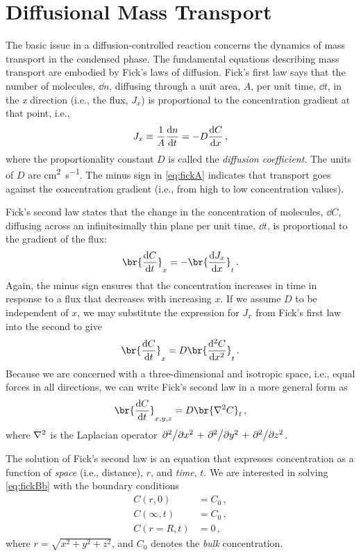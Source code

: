 \documentclass[nobib,nofonts,nols,nohyper]{tufte-handout}
\begin{document}
\section{Diffusional Mass Transport} %
\label{sec:mass_trans}
The basic issue in a diffusion-controlled reaction concerns the dynamics of mass transport in the condensed phase. 
The fundamental equations describing mass transport are embodied by Fick's laws of diffusion. 
Fick's first law says that the number of molecules, \( \dd{n} \), diffusing through a unit area, \( A \), per unit time, \( \dd{t} \), in the \emph{x} direction (i.e., the flux, \( J_x \)) is proportional to the concentration gradient at that point, i.e.,
\begin{equation}
	J_x \equiv \frac{1}{A}\dv{n}{t} = -D \dv{C}{x} \, ,
	\label{eq:fickA}
\end{equation}
where the proportionality constant \( D \) is called the \emph{diffusion coefficient}. 
The units of \( D \) are \unit{\cm\squared \per \s}. 
The minus sign in \cref{eq:fickA} indicates that transport goes against the concentration gradient
(i.e., from high to low concentration values).

Fick's second law states that the change in the concentration of molecules, \( \dd{C} \), diffusing
across an infinitesimally thin plane per unit time, \( \dd{t} \), is proportional to the gradient of the flux:
\begin{equation}
	\br{\dv{C}{t}}_x = - \br{\dv{J_x}{x}}_t \, .
\end{equation}
Again, the minus sign ensures that the concentration increases in time in response to a flux that decreases with increasing \( x \).
If we assume \( D \) to be independent of \( x \), we may substitute the expression for \( J_x \) from Fick's first law into the second to give
\begin{equation}
	\br{\dv{C}{t}}_x = D \br{\dv[2]{C}{x}}_t \, .
	\label{eq:fickBa}
\end{equation}
Because we are concerned with a three-dimensional and isotropic space, i.e., equal forces in all directions, we can write Fick's second law in a more general form as 
\begin{equation}
	\br{\dv{C}{t}}_{x, y, z} = D \br{\laplacian{C}}_t \, ,
	\label{eq:fickBb}
\end{equation}
where \( \laplacian{} \) is the Laplacian operator \( \pdv*[2]{x} + \pdv*[2]{y} + \pdv*[2]{z} \).

The solution of Fick's second law is an equation that expresses concentration as a function of \emph{space} (i.e., distance), \( r \), and \emph{time}, \( t \). 
We are interested in solving \cref{eq:fickBb} with the boundary conditions 
\begin{align*}
	C(r, 0) 		&= C_0 \, , \\
	C(\infty, t) 	&= C_0 \, , \\
	C(r=R, t) 	&= 0 \, ,
\end{align*}
where \( r = \sqrt{x^2 + y^2 + z^2} \), and \( C_0 \) denotes the \emph{bulk} concentration. 
\end{document}

